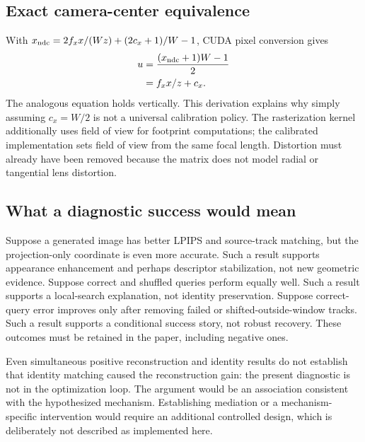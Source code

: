 \documentclass[10pt,twocolumn,letterpaper]{article}
\begin{document}
\subsection{Exact camera-center equivalence}
With $x_{\rm ndc}=2f_xx/(Wz)+(2c_x+1)/W-1$, CUDA pixel conversion gives
\begin{align}
u&=\frac{(x_{\rm ndc}+1)W-1}{2}\\
&=f_xx/z+c_x.
\end{align}
The analogous equation holds vertically. This derivation explains why simply assuming $c_x=W/2$ is not a universal calibration policy. The rasterization kernel additionally uses field of view for footprint computations; the calibrated implementation sets field of view from the same focal length. Distortion must already have been removed because the matrix does not model radial or tangential lens distortion.

\subsection{What a diagnostic success would mean}
Suppose a generated image has better LPIPS and source-track matching, but the projection-only coordinate is even more accurate. Such a result supports appearance enhancement and perhaps descriptor stabilization, not new geometric evidence. Suppose correct and shuffled queries perform equally well. Such a result supports a local-search explanation, not identity preservation. Suppose correct-query error improves only after removing failed or shifted-outside-window tracks. Such a result supports a conditional success story, not robust recovery. These outcomes must be retained in the paper, including negative ones.

Even simultaneous positive reconstruction and identity results do not establish that identity matching caused the reconstruction gain: the present diagnostic is not in the optimization loop. The argument would be an association consistent with the hypothesized mechanism. Establishing mediation or a mechanism-specific intervention would require an additional controlled design, which is deliberately not described as implemented here.
\end{document}
